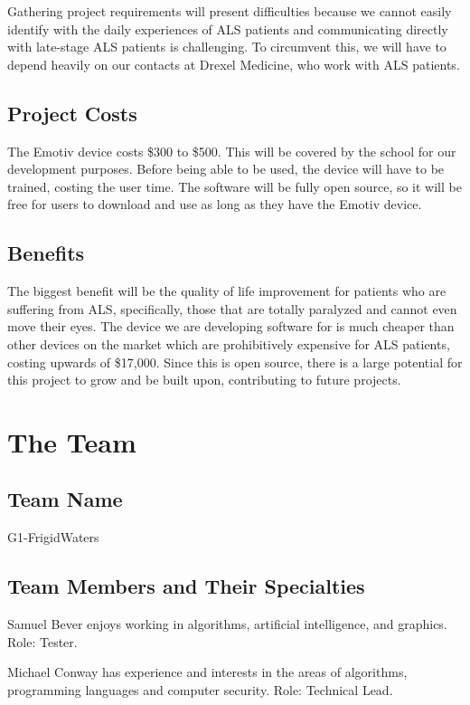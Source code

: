 \documentclass{report}
\begin{document}
Gathering project requirements will present difficulties because we cannot
easily identify with the daily experiences of ALS patients and communicating
directly with late-stage ALS patients is challenging. To circumvent this, we
will have to depend heavily on our contacts at Drexel Medicine, who work
with ALS patients.

\subsection*{Project Costs}
The Emotiv device\cite{Emotiv} costs \$300 to \$500. This will be covered by the school
for our development purposes. Before being able to be used, the device will
have to be trained, costing the user time. The software will be fully open
source, so it will be free for users to download and use as long as they
have the Emotiv device.

\subsection*{Benefits}
The biggest benefit will be the quality of life improvement for patients who
are suffering from ALS, specifically, those that are totally paralyzed and
cannot even move their eyes. The device we are developing software for is
much cheaper than other devices on the market which are prohibitively
expensive for ALS patients, costing upwards of \$17,000. Since this is open
source, there is a large potential for this project to grow and be built
upon, contributing to future projects.

\newpage
\section*{\centering The Team}

\subsection*{Team Name}

G1-FrigidWaters

\subsection*{Team Members and Their Specialties}

Samuel Bever enjoys working in algorithms, artificial intelligence, and
graphics. Role: Tester.

Michael Conway has experience and interests in the areas of algorithms,
programming languages and computer security. Role: Technical Lead.
\end{document}
